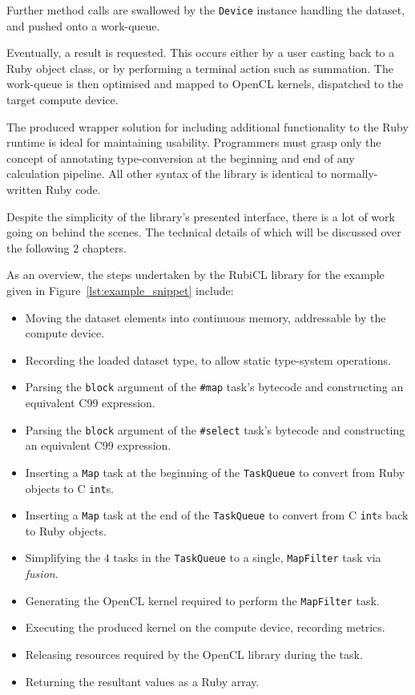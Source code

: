 Further method calls are swallowed by the \verb|Device| instance handling the dataset, and pushed onto a work-queue.

Eventually, a result is requested. This occurs either by a user casting back to a Ruby object class, or by performing a terminal action such as summation. The work-queue is then optimised and mapped to OpenCL kernels, dispatched to the target compute device.

The produced wrapper solution for including additional functionality to the Ruby runtime is ideal for maintaining usability. Programmers must grasp only the concept of annotating type-conversion at the beginning and end of any calculation pipeline. All other syntax of the library is identical to normally-written Ruby code.

Despite the simplicity of the library's presented interface, there is a lot of work going on behind the scenes. The technical details of which will be discussed over the following $2$ chapters.

As an overview, the steps undertaken by the RubiCL library for the example given in Figure~\ref{lst:example_snippet} include:
\begin{itemize}
  \item Moving the dataset elements into continuous memory, addressable by the compute device.
  \item Recording the loaded dataset type, to allow static type-system operations.
  \item Parsing the \verb|block| argument of the \verb|#map| task's bytecode and constructing an equivalent C99 expression.
  \item Parsing the \verb|block| argument of the \verb|#select| task's bytecode and constructing an equivalent C99 expression.
  \item Inserting a \verb|Map| task at the beginning of the \verb|TaskQueue| to convert from Ruby objects to C \verb|int|s.
  \item Inserting a \verb|Map| task at the end of the \verb|TaskQueue| to convert from C \verb|int|s back to Ruby objects.
  \item Simplifying the $4$ tasks in the \verb|TaskQueue| to a single, \verb|MapFilter| task via \emph{fusion}.
  \item Generating the OpenCL kernel required to perform the \verb|MapFilter| task.
  \item Executing the produced kernel on the compute device, recording metrics.
  \item Releasing resources required by the OpenCL library during the task.
  \item Returning the resultant values as a Ruby array.
\end{itemize}

